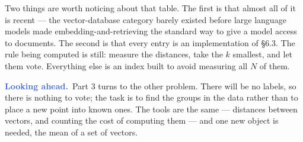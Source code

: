 \documentclass[11pt]{article}
\theoremstyle{plain}
\theoremstyle{definition}
\theoremstyle{remark}
\newcommand{\lookahead}{\par\smallskip\noindent
  \textbf{\sffamily\textcolor{RoyalBlue}{Looking ahead.}}\ \ignorespaces}
\begin{document}
\noindent Two things are worth noticing about that table. The first is that
almost all of it is recent --- the vector-database category barely existed
before large language models made embedding-and-retrieving the standard way to
give a model access to documents. The second is that every entry is an
implementation of \S6.3. The rule being computed is still: measure the
distances, take the $k$ smallest, and let them vote. Everything else is an index
built to avoid measuring all $N$ of them.

\lookahead Part 3 turns to the other problem. There will be no labels, so there
is nothing to vote; the task is to find the groups in the data rather than to
place a new point into known ones. The tools are the same --- distances between
vectors, and counting the cost of computing them --- and one new object is
needed, the mean of a set of vectors.
\end{document}
